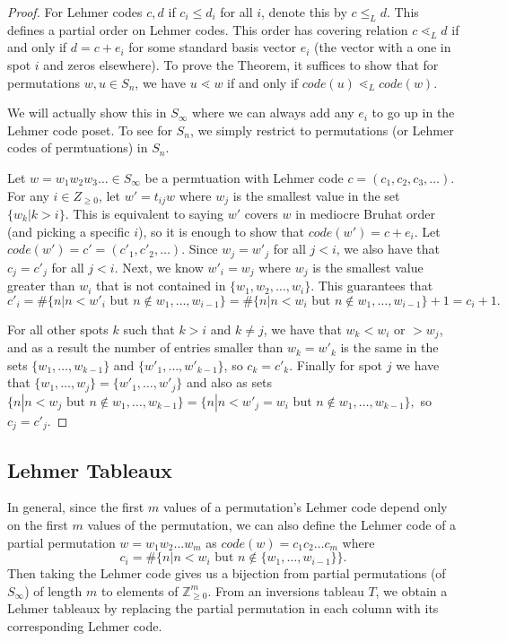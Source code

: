 \documentclass{article}
\theoremstyle{definition}
\begin{document}
\begin{proof}
    For Lehmer codes $c,d$ if $c_i \leq d_i$ for all $i$, denote this by $c \leq_L d$. This defines a partial order on Lehmer codes. This order has covering relation $c \lessdot_L d$ if and only if $d = c + e_i$ for some standard basis vector $e_i$ (the vector with a one in spot $i$ and zeros elsewhere). To prove the Theorem, it suffices to show that for permutations $w,u \in S_n$, we have $u \lessdot w$ if and only if $code(u) \lessdot_L code(w)$.  

    We will actually show this in $S_{\infty}$ where we can always add any $e_i$ to go up in the Lehmer code poset. To see for $S_n$, we simply restrict to permutations (or Lehmer codes of permtuations) in $S_n$.

    Let $w=w_1 w_2 w_3 \dots \in S_{\infty}$ be a permtuation with Lehmer code $c=(c_1,c_2,c_3,\dots)$. For any $i \in Z_{\geq 0}$, let $w' = t_{ij}w$ where $w_j$ is the smallest value in the set $\{w_k | k>i\}$. This is equivalent to saying $w'$ covers $w$ in mediocre Bruhat order (and picking a specific $i$), so it is enough to show that $code(w') = c + e_i$. Let $code(w') = c' = (c'_1, c'_2, \dots)$. Since $w_j = w'_j$ for all $j<i$, we also have that $c_j = c'_j$ for all $j<i$. Next, we know $w'_i =w_j$ where $w_j$ is the smallest value greater than $w_i$ that is not contained in $\{w_1,w_2, \dots, w_i\}$. This guarantees that
    $$c'_i = \#\{n | n < w'_i \text{ but } n \notin w_1, \dots ,w_{i-1}\} = \#\{n | n < w_i \text{ but } n \notin w_1, \dots ,w_{i-1}\}+1 =  c_i+1.$$
    
    For all other spots $k$ such that $k > i$ and $k\neq j$, we have that $w_k < w_i$ or $>w_j$, and as a result the number of entries smaller than $w_k=w'_k$ is the same in the sets $\{w_1, \dots , w_{k-1}\}$ and $\{w'_1, \dots, w'_{k-1}\}$, so $c_k = c'_k$.
    Finally for spot $j$ we have that $\{w_1, \dots ,w_j\} = \{w'_1, \dots , w'_j\}$ and also as sets
   $\{n | n < w_j \text{ but } n \notin w_1, \dots ,w_{k-1}\} = \{n | n < w'_j=w_i \text{ but } n \notin w_1, \dots ,w_{k-1}\},$
   so $c_j = c'_j$.
\end{proof}

\subsection{Lehmer Tableaux}


In general, since the first $m$ values of a permutation's Lehmer code depend only on the first $m$ values of the permutation, we can also define the Lehmer code of a partial permutation $w= w_1 w_2 \dots w_m$ as 
$code(w) = c_1 c_2 \dots c_m$ where
$$c_i = \#\{n | n < w_i \text{ but } n \notin \{w_1, \dots ,w_{i-1}\}\}.$$
Then taking the Lehmer code gives us a bijection from partial permutations (of $S_{\infty}$) of length $m$ to elements of $\mathbb{Z}^m_{\geq 0}$. From an inversions tableau $T$, we obtain a Lehmer tableaux by replacing the partial permutation in each column with its corresponding Lehmer code.
\end{document}
